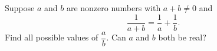 Suppose $a$ and $b$ are nonzero numbers with $a+b\ne0$ and
\[\dfrac{1}{a+b}=\dfrac1a+\dfrac1b.\]
Find all possible values of $\dfrac ab$. Can $a$ and $b$ both be real?
